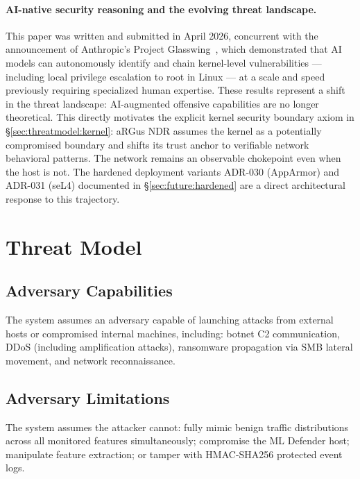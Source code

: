 \documentclass[11pt,a4paper]{article}
\begin{document}
    \paragraph{AI-native security reasoning and the evolving threat landscape.}
    This paper was written and submitted in April 2026, concurrent with the
    announcement of Anthropic's Project Glasswing~\cite{anthropic2026glasswing},
    which demonstrated that AI models can autonomously identify and chain
    kernel-level vulnerabilities --- including local privilege escalation to
    root in Linux --- at a scale and speed previously requiring specialized
    human expertise. These results represent a shift in the threat landscape:
    AI-augmented offensive capabilities are no longer theoretical.
    This directly motivates the explicit kernel security boundary axiom in
    \S\ref{sec:threatmodel:kernel}: aRGus NDR assumes the kernel as a
    potentially compromised boundary and shifts its trust anchor to
    verifiable network behavioral patterns. The network remains an observable
    chokepoint even when the host is not. The hardened deployment variants
    ADR-030 (AppArmor) and ADR-031 (seL4) documented in
    \S\ref{sec:future:hardened} are a direct architectural response to this
    trajectory.
    \section{Threat Model}

    \subsection{Adversary Capabilities}
    The system assumes an adversary capable of launching attacks from external hosts or
    compromised internal machines, including: botnet C2 communication, DDoS (including
    amplification attacks), ransomware propagation via SMB lateral movement, and network
    reconnaissance.

    \subsection{Adversary Limitations}
    The system assumes the attacker cannot: fully mimic benign traffic distributions across all
    monitored features simultaneously; compromise the ML Defender host; manipulate feature
    extraction; or tamper with HMAC-SHA256 protected event logs.
\end{document}
